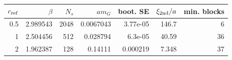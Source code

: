 \begin{tabular}{rrrrrrr}
\toprule
$c_{\rm ref}$ & $\beta$ & $N_s$ & $am_G$ & boot. SE & $\xi_{\rm 2nd}/a$ & min. blocks\\\midrule
0.5 & 2.989543 & 2048 & 0.0067043 & 3.77e-05 & 146.7 & 6\\
1 & 2.504456 & 512 & 0.028794 & 6.3e-05 & 40.59 & 36\\
2 & 1.962387 & 128 & 0.14111 & 0.000219 & 7.348 & 37\\
\bottomrule
\end{tabular}
